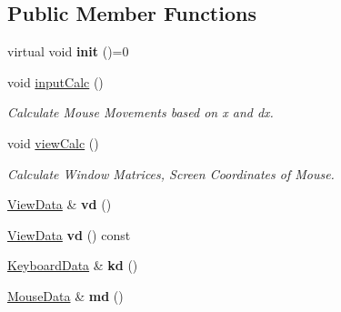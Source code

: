 \subsection*{Public Member Functions}
\begin{DoxyCompactItemize}
\item 
\hypertarget{classvsr_1_1_interface_a6d064e76ee55d594abfcf7401118fcf3}{virtual void {\bfseries init} ()=0}\label{classvsr_1_1_interface_a6d064e76ee55d594abfcf7401118fcf3}

\item 
\hypertarget{classvsr_1_1_interface_af00f9a19bd845332f58cd90052935ed8}{void \hyperlink{classvsr_1_1_interface_af00f9a19bd845332f58cd90052935ed8}{input\-Calc} ()}\label{classvsr_1_1_interface_af00f9a19bd845332f58cd90052935ed8}

\begin{DoxyCompactList}\small\item\em Calculate Mouse Movements based on x and dx. \end{DoxyCompactList}\item 
\hypertarget{classvsr_1_1_interface_a514fe24f1a702c408abf8bc961c2063d}{void \hyperlink{classvsr_1_1_interface_a514fe24f1a702c408abf8bc961c2063d}{view\-Calc} ()}\label{classvsr_1_1_interface_a514fe24f1a702c408abf8bc961c2063d}

\begin{DoxyCompactList}\small\item\em Calculate Window Matrices, Screen Coordinates of Mouse. \end{DoxyCompactList}\item 
\hypertarget{classvsr_1_1_interface_a3141e35c4aeb5ff37f80d7f39054df7d}{\hyperlink{structvsr_1_1_view_data}{View\-Data} \& {\bfseries vd} ()}\label{classvsr_1_1_interface_a3141e35c4aeb5ff37f80d7f39054df7d}

\item 
\hypertarget{classvsr_1_1_interface_a7547feb47638cdfb8cde4c12e79965c0}{\hyperlink{structvsr_1_1_view_data}{View\-Data} {\bfseries vd} () const }\label{classvsr_1_1_interface_a7547feb47638cdfb8cde4c12e79965c0}

\item 
\hypertarget{classvsr_1_1_interface_a97776db570337b8cae7117a1598d6ffd}{\hyperlink{structvsr_1_1_keyboard_data}{Keyboard\-Data} \& {\bfseries kd} ()}\label{classvsr_1_1_interface_a97776db570337b8cae7117a1598d6ffd}

\item 
\hypertarget{classvsr_1_1_interface_a798dd4e4aadd4dda17b2fe6f27a7d93b}{\hyperlink{structvsr_1_1_mouse_data}{Mouse\-Data} \& {\bfseries md} ()}\label{classvsr_1_1_interface_a798dd4e4aadd4dda17b2fe6f27a7d93b}


\end{DoxyCompactItemize}
